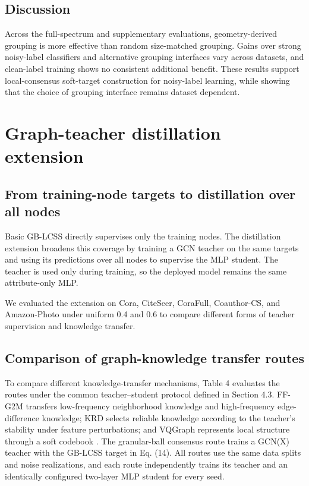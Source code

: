\documentclass[preprint,12pt]{elsarticle}
\begin{document}
\subsection{Discussion}\label{sec:5.6}

Across the full-spectrum and supplementary evaluations, geometry-derived grouping is more effective than random size-matched grouping. Gains over strong noisy-label classifiers and alternative grouping interfaces vary across datasets, and clean-label training shows no consistent additional benefit. These results support local-consensus soft-target construction for noisy-label learning, while showing that the choice of grouping interface remains dataset dependent.

\FloatBarrier

\section{Graph-teacher distillation extension}\label{sec:6}

\subsection{From training-node targets to distillation over all nodes}\label{sec:6.1}

Basic GB-LCSS directly supervises only the training nodes. The distillation extension broadens this coverage by training a GCN teacher on the same targets and using its predictions over all nodes to supervise the MLP student. The teacher is used only during training, so the deployed model remains the same attribute-only MLP.

We evaluated the extension on Cora, CiteSeer, CoraFull, Coauthor-CS, and Amazon-Photo under uniform 0.4 and 0.6 to compare different forms of teacher supervision and knowledge transfer.

\subsection{Comparison of graph-knowledge transfer routes}\label{sec:6.2}

To compare different knowledge-transfer mechanisms, Table 4 evaluates the routes under the common teacher--student protocol defined in Section 4.3. FF-G2M transfers low-frequency neighborhood knowledge and high-frequency edge-difference knowledge; KRD selects reliable knowledge according to the teacher's stability under feature perturbations; and VQGraph represents local structure through a soft codebook \cite{ref6,ref7,ref26}. The granular-ball consensus route trains a GCN(X) teacher with the GB-LCSS target in Eq. (14). All routes use the same data splits and noise realizations, and each route independently trains its teacher and an identically configured two-layer MLP student for every seed.
\end{document}
